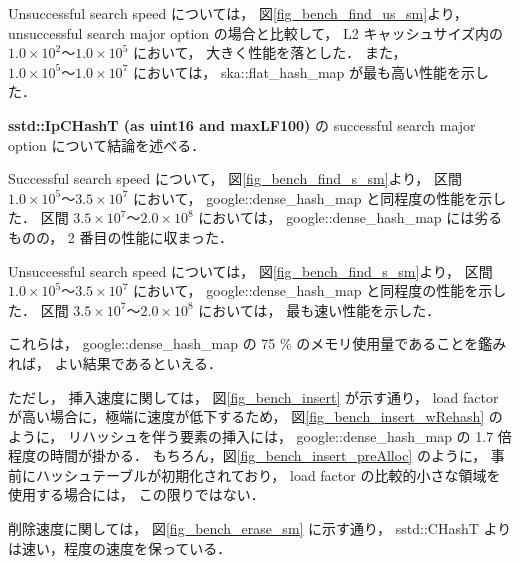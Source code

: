 Unsuccessful search speed については，
図\ref{fig_bench_find_us_sm}より，
unsuccessful search major option の場合と比較して，
L2 キャッシュサイズ内の $1.0\times10^2〜1.0\times10^5$ において，
大きく性能を落とした．
また，$1.0\times10^5〜1.0\times10^7$ においては，
ska::flat\_hash\_map が最も高い性能を示した．
\newline

{\bf sstd::IpCHashT (as uint16 and maxLF100)} の successful search major option について結論を述べる．

Successful search speed について，
図\ref{fig_bench_find_s_sm}より，
区間 $1.0\times10^5〜3.5\times10^7$ において，
google::dense\_hash\_map と同程度の性能を示した．
区間 $3.5\times10^7〜2.0\times10^8$ においては，
google::dense\_hash\_map には劣るものの，
2 番目の性能に収まった．

Unsuccessful search speed については，
図\ref{fig_bench_find_s_sm}より，
区間 $1.0\times10^5〜3.5\times10^7$ において，
google::dense\_hash\_map と同程度の性能を示した．
区間 $3.5\times10^7〜2.0\times10^8$ においては，
最も速い性能を示した．

これらは，
google::dense\_hash\_map の 75 \% のメモリ使用量であることを鑑みれば，
よい結果であるといえる．

ただし，
挿入速度に関しては，
図\ref{fig_bench_insert} が示す通り，
load factor が高い場合に，極端に速度が低下するため，
図\ref{fig_bench_insert_wRehash} のように，
リハッシュを伴う要素の挿入には，
google::dense\_hash\_map の 1.7 倍程度の時間が掛かる．
もちろん，図\ref{fig_bench_insert_preAlloc} のように，
事前にハッシュテーブルが初期化されており，
load factor の比較的小さな領域を使用する場合には，
この限りではない．

削除速度に関しては，
図\ref{fig_bench_erase_sm} に示す通り，
sstd::CHashT よりは速い，程度の速度を保っている．
\newline

